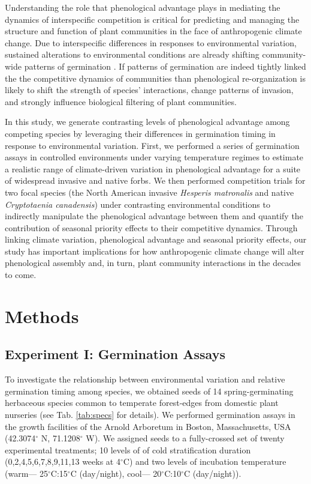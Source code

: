 \documentclass{article}[11pt]
\begin{document}
Understanding the role that phenological advantage plays in mediating the dynamics of interspecific competition is critical for predicting and managing the structure and function of plant communities in the face of anthropogenic climate change. Due  to interspecific differences in responses to environmental variation, sustained alterations to environmental conditions are already shifting community-wide patterns of germination \citep{Walck2011}. If patterns of germination are indeed tightly linked the the competitive dynamics of communities than phenological re-organization is likely to shift the strength of species' interactions, change patterns of invasion, and strongly influence biological filtering of plant communities. 

In this study, we generate contrasting levels of phenological advantage among competing species by leveraging their differences in germination timing in response to environmental variation. First, we performed a series of germination assays in controlled environments under varying temperature regimes to estimate a realistic range of climate-driven variation in phenological advantage for a suite of widespread invasive and native forbs. We then performed competition trials for two focal species (the North American invasive \textit{Hesperis matronalis} and native \textit{Cryptotaenia canadensis}) under contrasting environmental conditions to indirectly manipulate the phenological advantage between them and quantify the contribution of seasonal priority effects to their competitive dynamics. Through linking climate variation, phenological advantage and seasonal priority effects, our study has important implications for how anthropogenic climate change will alter phenological assembly and, in turn, plant community interactions in the decades to come.

\section*{Methods}
\subsection*{Experiment I: Germination Assays}
To investigate the relationship between environmental variation and relative germination timing among species, we obtained seeds of 14 spring-germinating herbaceous species common to temperate forest-edges from domestic plant nurseries (see Tab. \ref{tab:specs} for details). We performed germination assays in the growth facilities of the Arnold Arboretum in Boston, Massachusetts, USA (42.3074$^{\circ}$ N, 71.1208$^{\circ}$ W). We assigned seeds to a fully-crossed set of twenty experimental treatments; 10 levels of of cold stratification duration (0,2,4,5,6,7,8,9,11,13 weeks at 4$^{\circ}$C) and two levels of incubation temperature (warm--- 25$^{\circ}$C:15$^{\circ}$C (day/night), cool--- 20$^{\circ}$C:10$^{\circ}$C (day/night)).
\end{document}
